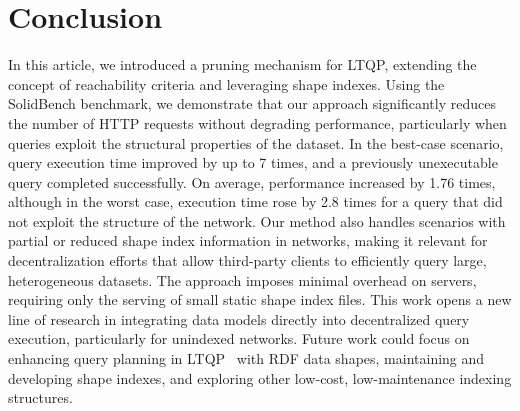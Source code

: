 \section{Conclusion}\label{sec:conclusion}

In this article, we introduced a pruning mechanism for LTQP, extending the concept of reachability criteria and leveraging shape indexes. 
Using the SolidBench benchmark, we demonstrate that our approach significantly reduces the number of HTTP requests without degrading performance, particularly when queries exploit the structural properties of the dataset.
In the best-case scenario, query execution time improved by up to 7 times, and a previously unexecutable query completed successfully.
On average, performance increased by 1.76 times, although in the worst case, execution time rose by 2.8 times for a query that did not exploit the structure of the network.  
Our method also handles scenarios with partial or reduced shape index information in networks, making it relevant for decentralization efforts that allow third-party clients to efficiently query large, heterogeneous datasets.
The approach imposes minimal overhead on servers, requiring only the serving of small static shape index files. 
This work opens a new line of research in integrating data models directly into decentralized query execution, particularly for unindexed networks.
Future work could focus on enhancing query planning in LTQP~\cite{taelman2024towards} with RDF data shapes, maintaining and developing shape indexes, and exploring other low-cost, low-maintenance indexing structures.


